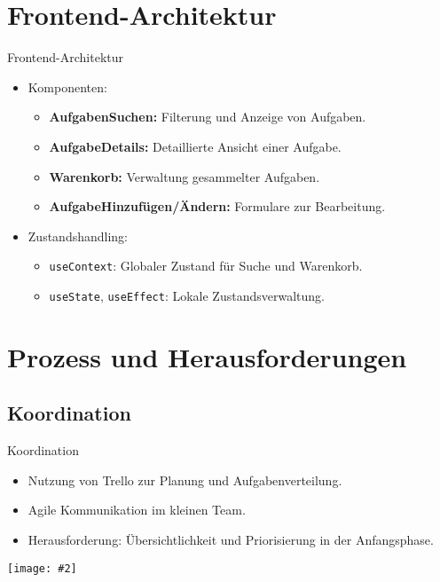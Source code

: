 \documentclass{beamer}
\newcommand{\centfig}[2]{\begin{center}
  \texttt{[image: \#2]}
  \end{center}}
\begin{document}
\section{Frontend-Architektur}
\begin{frame}{Frontend-Architektur}
    \begin{itemize}
        \item<1-> Komponenten:
        \begin{itemize}
            \item \textbf{AufgabenSuchen:} Filterung und Anzeige von Aufgaben.
            \item \textbf{AufgabeDetails:} Detaillierte Ansicht einer Aufgabe.
            \item \textbf{Warenkorb:} Verwaltung gesammelter Aufgaben.
            \item \textbf{AufgabeHinzufügen/Ändern:} Formulare zur Bearbeitung.
        \end{itemize}
        \item<2-> Zustandshandling:
        \begin{itemize}
            \item \texttt{useContext}: Globaler Zustand für Suche und Warenkorb.
            \item \texttt{useState}, \texttt{useEffect}: Lokale Zustandsverwaltung.
        \end{itemize}
    \end{itemize}
\end{frame}

\section{Prozess und Herausforderungen}
\subsection{Koordination}
\begin{frame}{Koordination}
    \begin{itemize}
        \item Nutzung von Trello zur Planung und Aufgabenverteilung.
        \item Agile Kommunikation im kleinen Team.
        \item Herausforderung: Übersichtlichkeit und Priorisierung in der Anfangsphase.
    \end{itemize}
    \centfig{0.6}{trello.png}
\end{frame}
\end{document}
